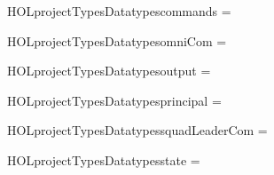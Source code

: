 \newcommand{\HOLprojectTypesDate}{27 December 2018}
\newcommand{\HOLprojectTypesTime}{12:52}
\begin{SaveVerbatim}{HOLprojectTypesDatatypescommands}
 =   \HOLTokenBar{}  
\end{SaveVerbatim}
\newcommand{\HOLprojectTypesDatatypescommands}{\UseVerbatim{HOLprojectTypesDatatypescommands}}
\begin{SaveVerbatim}{HOLprojectTypesDatatypesomniCom}
 =  \HOLTokenBar{} 
\end{SaveVerbatim}
\newcommand{\HOLprojectTypesDatatypesomniCom}{\UseVerbatim{HOLprojectTypesDatatypesomniCom}}
\begin{SaveVerbatim}{HOLprojectTypesDatatypesoutput}
 =  \HOLTokenBar{}  \HOLTokenBar{}  \HOLTokenBar{} 
       \HOLTokenBar{}  \HOLTokenBar{}  \HOLTokenBar{} 
\end{SaveVerbatim}
\newcommand{\HOLprojectTypesDatatypesoutput}{\UseVerbatim{HOLprojectTypesDatatypesoutput}}
\begin{SaveVerbatim}{HOLprojectTypesDatatypesprincipal}
 =  \HOLTokenBar{} 
\end{SaveVerbatim}
\newcommand{\HOLprojectTypesDatatypesprincipal}{\UseVerbatim{HOLprojectTypesDatatypesprincipal}}
\begin{SaveVerbatim}{HOLprojectTypesDatatypessquadLeaderCom}
 =  \HOLTokenBar{}  \HOLTokenBar{}  \HOLTokenBar{} 
\end{SaveVerbatim}
\newcommand{\HOLprojectTypesDatatypessquadLeaderCom}{\UseVerbatim{HOLprojectTypesDatatypessquadLeaderCom}}
\begin{SaveVerbatim}{HOLprojectTypesDatatypesstate}
 =  \HOLTokenBar{}  \HOLTokenBar{}  \HOLTokenBar{}  \HOLTokenBar{} 
\end{SaveVerbatim}
\newcommand{\HOLprojectTypesDatatypesstate}{\UseVerbatim{HOLprojectTypesDatatypesstate}}
\newcommand{\HOLprojectTypesDatatypes}{
\HOLprojectTypesDatatypescommands\HOLprojectTypesDatatypesomniCom\HOLprojectTypesDatatypesoutput\HOLprojectTypesDatatypesprincipal\HOLprojectTypesDatatypessquadLeaderCom\HOLprojectTypesDatatypesstate}
